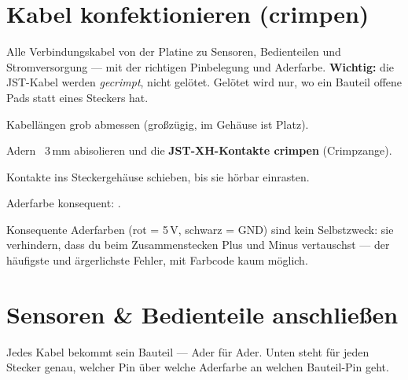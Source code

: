 \clearpage
\section{Kabel konfektionieren (crimpen)}
\begin{ziel}
Alle Verbindungskabel von der Platine zu Sensoren, Bedienteilen und Stromversorgung — mit
der richtigen Pinbelegung und Aderfarbe. \textbf{Wichtig:} die JST-Kabel werden
\emph{gecrimpt}, nicht gelötet. Gelötet wird nur, wo ein Bauteil offene Pads statt eines
Steckers hat.
\end{ziel}
\begin{schritte}
  \item Kabellängen grob abmessen (großzügig, im Gehäuse ist Platz).
  \item Adern ~3\,mm abisolieren und die \textbf{JST-XH-Kontakte crimpen} (Crimpzange).
  \item Kontakte ins Steckergehäuse schieben, bis sie hörbar einrasten.
  \item Aderfarbe konsequent:  \quad {} \quad
         \quad {} \quad {} \quad
         \quad {}.
\end{schritte}
\begin{warum}
Konsequente Aderfarben (rot = 5\,V, schwarz = GND) sind kein Selbstzweck: sie verhindern,
dass du beim Zusammenstecken Plus und Minus vertauschst — der häufigste und ärgerlichste
Fehler, mit Farbcode kaum möglich.
\end{warum}

\clearpage
\section{Sensoren \& Bedienteile anschließen}
\begin{ziel}
Jedes Kabel bekommt sein Bauteil — Ader für Ader. Unten steht für jeden Stecker genau,
welcher Pin über welche Aderfarbe an welchen Bauteil-Pin geht.
\end{ziel}


